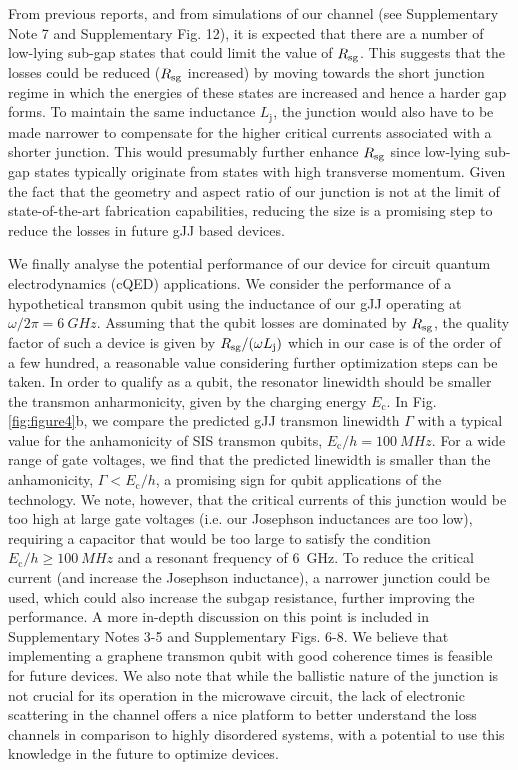From previous reports\cite{rosdahl_andreev_2018}, and from simulations of our channel (see Supplementary Note 7 and Supplementary Fig. 12), it is expected that there are a number of low-lying sub-gap states that could limit the value of $R_{\rm sg}$.
This suggests that the losses could be reduced ($R_{\rm sg}$ increased) by moving towards the short junction regime in which the energies of these states are increased and hence a harder gap forms.
To maintain the same inductance $L_\textrm{j}$, the junction would also have to be made narrower to compensate for the higher critical currents associated with a shorter junction.
This would presumably further enhance $R_{\rm sg}$ since low-lying sub-gap states typically originate from states with high transverse momentum.
Given the fact that the geometry and aspect ratio of our junction is not at the limit of state-of-the-art fabrication capabilities, reducing the size is a promising step to reduce the losses in future gJJ based devices.

We finally analyse the potential performance of our device for circuit quantum electrodynamics (cQED) applications.
We consider the performance of a hypothetical transmon qubit \cite{koch_chargeinsensitive_2007} using the inductance of our gJJ operating at $\omega/2\pi=\SI{6}{GHz}$.
Assuming that the qubit losses are dominated by $R_{\rm sg}$, the quality factor of such a device is given by $R_{\rm sg}/(\omega L_\textrm{j})$ which in our case is of the order of a few hundred, a reasonable value considering further optimization steps can be taken.
In order to qualify as a qubit, the resonator linewidth should be smaller the transmon anharmonicity, given by the charging energy $E_\textrm{c}$.
In Fig. \ref{fig:figure4}b, we compare the predicted gJJ transmon linewidth $\Gamma$ with a typical value for the anhamonicity of SIS transmon qubits, $E_\textrm{c}/h = \SI{100}{MHz}$.
For a wide range of gate voltages, we find that the predicted linewidth is smaller than the anhamonicity, $\Gamma < E_\textrm{c}/h$, a promising sign for qubit applications of the technology.
We note, however, that the critical currents of this junction would be too high at large gate voltages (i.e. our Josephson inductances are too low), requiring a capacitor that would be too large to satisfy the condition $E_\textrm{c}/h \geq \SI{100}{MHz}$ and a resonant frequency of \SI{6}{GHz}.
To reduce the critical current (and increase the Josephson inductance), a narrower junction could be used, which could also increase the subgap resistance, further improving the performance.
A more in-depth discussion on this point is included in Supplementary Notes 3-5 and Supplementary Figs. 6-8.
We believe that implementing a graphene transmon qubit with good coherence times is feasible for future devices.
We also note that while the ballistic nature of the junction is not crucial for its operation in the microwave circuit, the lack of electronic scattering in the channel offers a nice platform to better understand the loss channels in comparison to highly disordered systems, with a potential to use this knowledge in the future to optimize devices. 

